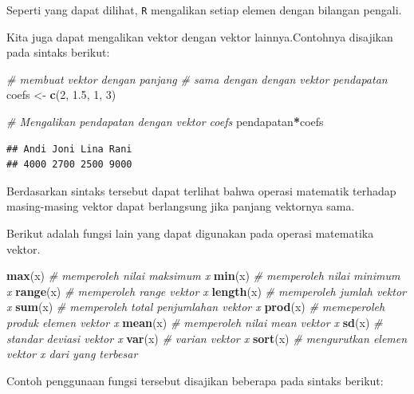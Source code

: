 \documentclass[
]{book}
\newenvironment{Shaded}{\begin{snugshade}}{\end{snugshade}}
\newcommand{\CommentTok}[1]{\textcolor[rgb]{0.56,0.35,0.01}{\textit{#1}}}
\newcommand{\DecValTok}[1]{\textcolor[rgb]{0.00,0.00,0.81}{#1}}
\newcommand{\FloatTok}[1]{\textcolor[rgb]{0.00,0.00,0.81}{#1}}
\newcommand{\FunctionTok}[1]{\textcolor[rgb]{0.13,0.29,0.53}{\textbf{#1}}}
\newcommand{\NormalTok}[1]{#1}
\newcommand{\OtherTok}[1]{\textcolor[rgb]{0.56,0.35,0.01}{#1}}
\newcommand{\SpecialCharTok}[1]{\textcolor[rgb]{0.81,0.36,0.00}{\textbf{#1}}}
\theoremstyle{definition}
\theoremstyle{definition}
\theoremstyle{definition}
\theoremstyle{definition}
\theoremstyle{remark}
\begin{document}
Seperti yang dapat dilihat, \texttt{R} mengalikan setiap elemen dengan bilangan pengali.

Kita juga dapat mengalikan vektor dengan vektor lainnya.Contohnya disajikan pada sintaks berikut:

\begin{Shaded}
\begin{Highlighting}[]
\CommentTok{\# membuat vektor dengan panjang }
\CommentTok{\# sama dengan dengan vektor pendapatan}
\NormalTok{coefs }\OtherTok{\textless{}{-}} \FunctionTok{c}\NormalTok{(}\DecValTok{2}\NormalTok{, }\FloatTok{1.5}\NormalTok{, }\DecValTok{1}\NormalTok{, }\DecValTok{3}\NormalTok{)}

\CommentTok{\# Mengalikan pendapatan dengan vektor coefs}
\NormalTok{pendapatan}\SpecialCharTok{*}\NormalTok{coefs}
\end{Highlighting}
\end{Shaded}

\begin{verbatim}
## Andi Joni Lina Rani 
## 4000 2700 2500 9000
\end{verbatim}

Berdasarkan sintaks tersebut dapat terlihat bahwa operasi matematik terhadap masing-masing vektor dapat berlangsung jika panjang vektornya sama.

Berikut adalah fungsi lain yang dapat digunakan pada operasi matematika vektor.

\begin{Shaded}
\begin{Highlighting}[]
\FunctionTok{max}\NormalTok{(x) }\CommentTok{\# memperoleh nilai maksimum x}
\FunctionTok{min}\NormalTok{(x) }\CommentTok{\# memperoleh nilai minimum x}
\FunctionTok{range}\NormalTok{(x) }\CommentTok{\# memperoleh range vektor x}
\FunctionTok{length}\NormalTok{(x) }\CommentTok{\# memperoleh jumlah vektor x}
\FunctionTok{sum}\NormalTok{(x) }\CommentTok{\# memperoleh total penjumlahan vektor x}
\FunctionTok{prod}\NormalTok{(x) }\CommentTok{\# memeperoleh produk elemen vektor x}
\FunctionTok{mean}\NormalTok{(x) }\CommentTok{\# memperoleh nilai mean vektor x}
\FunctionTok{sd}\NormalTok{(x) }\CommentTok{\# standar deviasi vektor x}
\FunctionTok{var}\NormalTok{(x) }\CommentTok{\# varian vektor x}
\FunctionTok{sort}\NormalTok{(x) }\CommentTok{\# mengurutkan elemen vektor x dari yang terbesar}
\end{Highlighting}
\end{Shaded}

Contoh penggunaan fungsi tersebut disajikan beberapa pada sintaks berikut:
\end{document}
